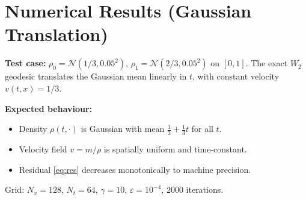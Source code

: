 \documentclass[11pt]{article}
\newcommand{\rhoO}{\rho_0}
\newcommand{\rhoT}{\rho_1}
\begin{document}
\section{Numerical Results (Gaussian Translation)}

\textbf{Test case:} $\rhoO = \mathcal{N}(1/3, 0.05^2)$,
$\rhoT = \mathcal{N}(2/3, 0.05^2)$ on $[0,1]$.
The exact $W_2$ geodesic translates the Gaussian mean linearly in $t$,
with constant velocity $v(t,x) = 1/3$.

\textbf{Expected behaviour:}
\begin{itemize}
  \item Density $\rho(t,\cdot)$ is Gaussian with mean $\tfrac{1}{3} + \tfrac{1}{3}t$ for all $t$.
  \item Velocity field $v=m/\rho$ is spatially uniform and time-constant.
  \item Residual \eqref{eq:res} decreases monotonically to machine precision.
\end{itemize}

Grid: $N_x=128$, $N_t=64$, $\gamma=10$, $\varepsilon=10^{-4}$, 2000 iterations.
\end{document}
